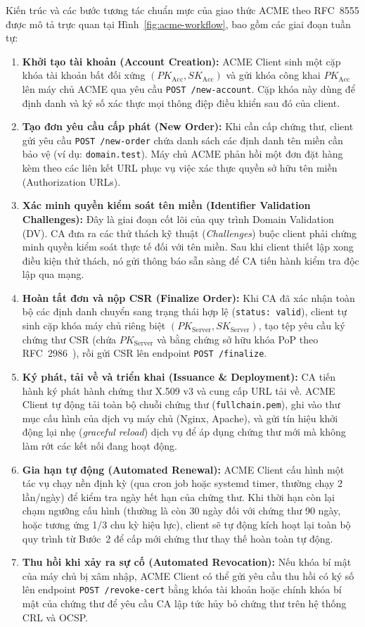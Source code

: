 Kiến trúc và các bước tương tác chuẩn mực của giao thức ACME theo RFC~8555 được mô tả trực quan tại Hình~\ref{fig:acme-workflow}, bao gồm các giai đoạn tuần tự:
\begin{enumerate}
    \item \textbf{Khởi tạo tài khoản (Account Creation):} ACME Client sinh một cặp khóa tài khoản bất đối xứng $(PK_{\mathrm{Acc}}, SK_{\mathrm{Acc}})$ và gửi khóa công khai $PK_{\mathrm{Acc}}$ lên máy chủ ACME qua yêu cầu \texttt{POST /new-account}. Cặp khóa này dùng để định danh và ký số xác thực mọi thông điệp điều khiển sau đó của client.
    \item \textbf{Tạo đơn yêu cầu cấp phát (New Order):} Khi cần cấp chứng thư, client gửi yêu cầu \texttt{POST /new-order} chứa danh sách các định danh tên miền cần bảo vệ (ví dụ: \texttt{domain.test}). Máy chủ ACME phản hồi một đơn đặt hàng kèm theo các liên kết URL phục vụ việc xác thực quyền sở hữu tên miền (Authorization URLs).
    \item \textbf{Xác minh quyền kiểm soát tên miền (Identifier Validation Challenges):} Đây là giai đoạn cốt lõi của quy trình Domain Validation (DV). CA đưa ra các thử thách kỹ thuật (\textit{Challenges}) buộc client phải chứng minh quyền kiểm soát thực tế đối với tên miền. Sau khi client thiết lập xong điều kiện thử thách, nó gửi thông báo sẵn sàng để CA tiến hành kiểm tra độc lập qua mạng.
    \item \textbf{Hoàn tất đơn và nộp CSR (Finalize Order):} Khi CA đã xác nhận toàn bộ các định danh chuyển sang trạng thái hợp lệ (\texttt{status: valid}), client tự sinh cặp khóa máy chủ riêng biệt $(PK_{\mathrm{Server}}, SK_{\mathrm{Server}})$, tạo tệp yêu cầu ký chứng thư CSR (chứa $PK_{\mathrm{Server}}$ và bằng chứng sở hữu khóa PoP theo RFC~2986~\cite{rfc2986}), rồi gửi CSR lên endpoint \texttt{POST /finalize}.
    \item \textbf{Ký phát, tải về và triển khai (Issuance \& Deployment):} CA tiến hành ký phát hành chứng thư X.509 v3 và cung cấp URL tải về. ACME Client tự động tải toàn bộ chuỗi chứng thư (\texttt{fullchain.pem}), ghi vào thư mục cấu hình của dịch vụ máy chủ (Nginx, Apache), và gửi tín hiệu khởi động lại nhẹ (\textit{graceful reload}) dịch vụ để áp dụng chứng thư mới mà không làm rớt các kết nối đang hoạt động.
    \item \textbf{Gia hạn tự động (Automated Renewal):} ACME Client cấu hình một tác vụ chạy nền định kỳ (qua cron job hoặc systemd timer, thường chạy 2 lần/ngày) để kiểm tra ngày hết hạn của chứng thư. Khi thời hạn còn lại chạm ngưỡng cấu hình (thường là còn 30 ngày đối với chứng thư 90 ngày, hoặc tương ứng 1/3 chu kỳ hiệu lực), client sẽ tự động kích hoạt lại toàn bộ quy trình từ Bước~2 để cấp mới chứng thư thay thế hoàn toàn tự động.
    \item \textbf{Thu hồi khi xảy ra sự cố (Automated Revocation):} Nếu khóa bí mật của máy chủ bị xâm nhập, ACME Client có thể gửi yêu cầu thu hồi có ký số lên endpoint \texttt{POST /revoke-cert} bằng khóa tài khoản hoặc chính khóa bí mật của chứng thư để yêu cầu CA lập tức hủy bỏ chứng thư trên hệ thống CRL và OCSP.
\end{enumerate}

